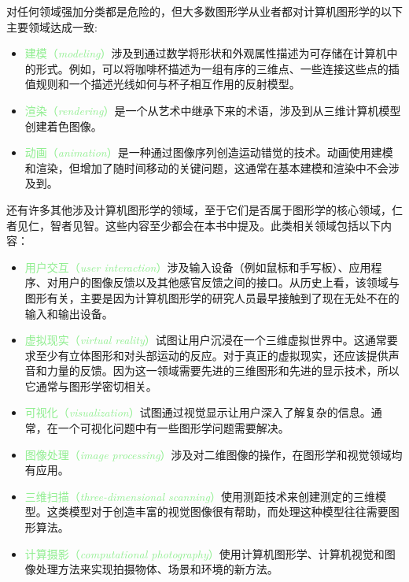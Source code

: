 \documentclass[lang=cn,12pt]{elegantbook}
\begin{document}
对任何领域强加分类都是危险的，但大多数图形学从业者都对计算机图形学的以下主要领域达成一致:

\begin{itemize}
  \item \textcolor{lightgreen}{建模（\textit{modeling}）}涉及到通过数学将形状和外观属性描述为可存储在计算机中的形式。例如，可以将咖啡杯描述为一组有序的三维点、一些连接这些点的插值规则和一个描述光线如何与杯子相互作用的反射模型。
  \item \textcolor{lightgreen}{渲染（\textit{rendering}）}是一个从艺术中继承下来的术语，涉及到从三维计算机模型创建着色图像。
  \item \textcolor{lightgreen}{动画（\textit{animation}）}是一种通过图像序列创造运动错觉的技术。动画使用建模和渲染，但增加了随时间移动的关键问题，这通常在基本建模和渲染中不会涉及到。
\end{itemize}

还有许多其他涉及计算机图形学的领域，至于它们是否属于图形学的核心领域，仁者见仁，智者见智。这些内容至少都会在本书中提及。此类相关领域包括以下内容：

\begin{itemize}
  \item \textcolor{lightgreen}{用户交互（\textit{user interaction}）}涉及输入设备（例如鼠标和手写板）、应用程序、对用户的图像反馈以及其他感官反馈之间的接口。从历史上看，该领域与图形有关，主要是因为计算机图形学的研究人员最早接触到了现在无处不在的输入和输出设备。
  \item \textcolor{lightgreen}{虚拟现实（\textit{virtual reality}）}试图让用户沉浸在一个三维虚拟世界中。这通常要求至少有立体图形和对头部运动的反应。对于真正的虚拟现实，还应该提供声音和力量的反馈。因为这一领域需要先进的三维图形和先进的显示技术，所以它通常与图形学密切相关。
  \item \textcolor{lightgreen}{可视化（\textit{visualization}）}试图通过视觉显示让用户深入了解复杂的信息。通常，在一个可视化问题中有一些图形学问题需要解决。
  \item \textcolor{lightgreen}{图像处理（\textit{image processing}）}涉及对二维图像的操作，在图形学和视觉领域均有应用。
  \item \textcolor{lightgreen}{三维扫描（\textit{three-dimensional scanning}）}使用测距技术来创建测定的三维模型。这类模型对于创造丰富的视觉图像很有帮助，而处理这种模型往往需要图形算法。
  \item \textcolor{lightgreen}{计算摄影（\textit{computational photography}）}使用计算机图形学、计算机视觉和图像处理方法来实现拍摄物体、场景和环境的新方法。
\end{itemize}
\end{document}
